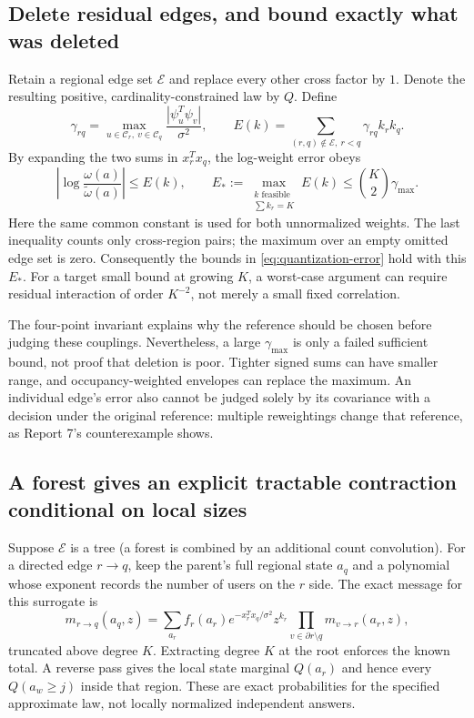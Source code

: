 \documentclass[10pt,a4paper]{article}
\begin{document}
\subsection{Delete residual edges, and bound exactly what was deleted}
Retain a regional edge set $\mathcal E$ and replace every other cross factor by $1$. Denote the resulting
positive, cardinality-constrained law by $Q$. Define
\[
 \gamma_{rq}=\max_{u\in\mathcal C_r,\ v\in\mathcal C_q}
          \frac{|\psi_u^T\psi_v|}{\sigma^2},\qquad
 E(k)=\sum_{(r,q)\notin\mathcal E,\ r<q}\gamma_{rq}k_rk_q.
\]
By expanding the two sums in $x_r^Tx_q$, the log-weight error obeys
\begin{equation}
 \left|\log\frac{\omega(a)}{\widetilde\omega(a)}\right|\leq E(k),\qquad
 E_*:=\max_{\substack{k\text{ feasible}\\\sum k_r=K}}E(k)
 \leq\binom K2\gamma_{\max}.
 \label{eq:edge-error}
\end{equation}
Here the same common constant is used for both unnormalized weights. The last inequality counts only
cross-region pairs; the maximum over an empty omitted edge set is zero. Consequently the bounds in
\eqref{eq:quantization-error} hold with this $E_*$. For a target small bound at growing $K$, a worst-case
argument can require residual interaction of order $K^{-2}$, not merely a small fixed correlation.

The four-point invariant explains why the reference should be chosen before judging these couplings.
Nevertheless, a large $\gamma_{\max}$ is only a failed sufficient bound, not proof that deletion is poor.
Tighter signed sums can have smaller range, and occupancy-weighted envelopes can replace the maximum.
An individual edge's error also cannot be judged solely by its covariance with a decision under the original
reference: multiple reweightings change that reference, as Report 7's counterexample shows.

\subsection{A forest gives an explicit tractable contraction conditional on local sizes}
Suppose $\mathcal E$ is a tree (a forest is combined by an additional count convolution). For a directed
edge $r\to q$, keep the parent's full regional state $a_q$ and a polynomial whose exponent records the
number of users on the $r$ side. The exact message for this surrogate is
\begin{equation}
 m_{r\to q}(a_q,z)=\sum_{a_r} f_r(a_r)e^{-x_r^Tx_q/\sigma^2}z^{k_r}
       \prod_{v\in\partial r\setminus q}m_{v\to r}(a_r,z),
 \label{eq:regional-message}
\end{equation}
truncated above degree $K$. Extracting degree $K$ at the root enforces the known total. A reverse pass gives
the local state marginal $Q(a_r)$ and hence every $Q(a_w\geq j)$ inside that region. These are exact
probabilities for the specified approximate law, not locally normalized independent answers.
\end{document}
